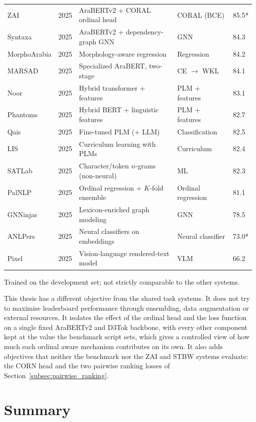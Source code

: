 \documentclass[12pt]{report}
\begin{document}
\begin{table}[H]
\begin{tabular}{p{2.4cm} p{0.8cm} p{4.8cm} p{2.2cm} p{1.2cm}}
ZAI & 2025 & AraBERTv2 + CORAL ordinal head & CORAL (BCE) & 85.5* \\
Syntaxa & 2025 & AraBERTv2 + dependency-graph GNN & GNN & 84.3 \\
MorphoArabia & 2025 & Morphology-aware regression & Regression & 84.2 \\
MARSAD & 2025 & Specialized AraBERT, two-stage & CE $\rightarrow$ WKL & 84.1 \\
Noor & 2025 & Hybrid transformer + features & PLM + features & 83.1 \\
Phantoms & 2025 & Hybrid BERT + linguistic features & PLM + features & 82.7 \\
Qais & 2025 & Fine-tuned PLM (+ LLM) & Classification & 82.5 \\
LIS & 2025 & Curriculum learning with PLMs & Curriculum & 82.4 \\
SATLab & 2025 & Character/token $n$-grams (non-neural) & ML & 82.3 \\
PalNLP & 2025 & Ordinal regression + $K$-fold ensemble & Ordinal regression & 81.1 \\
GNNinjas & 2025 & Lexicon-enriched graph modeling & GNN & 78.5 \\
ANLPers & 2025 & Neural classifiers on embeddings & Neural classifier & 73.0* \\
Pixel & 2025 & Vision-language rendered-text model & VLM & 66.2 \\
\bottomrule
\end{tabular}

\vspace{0.15cm}
{\footnotesize * Trained on the development set; not strictly comparable to the other systems.}
\end{table}

This thesis has a different objective from the shared task systems. It does not try to maximise leaderboard performance through ensembling, data augmentation or external resources. It isolates the effect of the ordinal head and the loss function on a single fixed AraBERTv2 and D3Tok backbone, with every other component kept at the value the benchmark script sets, which gives a controlled view of how much each ordinal aware mechanism contributes on its own. It also adds objectives that neither the benchmark nor the ZAI and STBW systems evaluate: the CORN head and the two pairwise ranking losses of Section~\ref{subsec:pairwise_ranking}.
\section{Summary}
\end{document}
